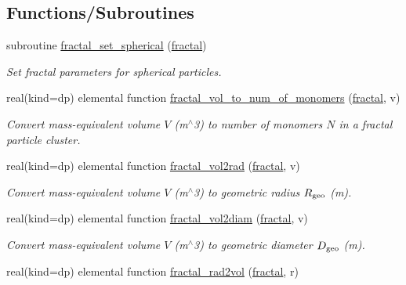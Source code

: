 \subsection*{Functions/\+Subroutines}
\begin{DoxyCompactItemize}
\item 
subroutine \mbox{\hyperlink{namespacepmc__fractal_a6cd53990cfa3426e50dc4c7128a50d6f}{fractal\+\_\+set\+\_\+spherical}} (\mbox{\hyperlink{fractal_8_f90_a949ba7f6f3ce672ed686152acedb28bf}{fractal}})
\begin{DoxyCompactList}\small\item\em Set fractal parameters for spherical particles. \end{DoxyCompactList}\item 
real(kind=dp) elemental function \mbox{\hyperlink{namespacepmc__fractal_a8c77994ce359f18d1a6ada818ac19875}{fractal\+\_\+vol\+\_\+to\+\_\+num\+\_\+of\+\_\+monomers}} (\mbox{\hyperlink{fractal_8_f90_a949ba7f6f3ce672ed686152acedb28bf}{fractal}}, v)
\begin{DoxyCompactList}\small\item\em Convert mass-\/equivalent volume $V$ (m$^\wedge$3) to number of monomers $N$ in a fractal particle cluster. \end{DoxyCompactList}\item 
real(kind=dp) elemental function \mbox{\hyperlink{namespacepmc__fractal_a0bd8a2235975755762809e39c2c8e900}{fractal\+\_\+vol2rad}} (\mbox{\hyperlink{fractal_8_f90_a949ba7f6f3ce672ed686152acedb28bf}{fractal}}, v)
\begin{DoxyCompactList}\small\item\em Convert mass-\/equivalent volume $V$ (m$^\wedge$3) to geometric radius $R_{\rm geo}$ (m). \end{DoxyCompactList}\item 
real(kind=dp) elemental function \mbox{\hyperlink{namespacepmc__fractal_ae2dded7baed16c325ff4b95285e83593}{fractal\+\_\+vol2diam}} (\mbox{\hyperlink{fractal_8_f90_a949ba7f6f3ce672ed686152acedb28bf}{fractal}}, v)
\begin{DoxyCompactList}\small\item\em Convert mass-\/equivalent volume $V$ (m$^\wedge$3) to geometric diameter $D_{\rm geo}$ (m). \end{DoxyCompactList}\item 
real(kind=dp) elemental function \mbox{\hyperlink{namespacepmc__fractal_a79cb00ff9fbed9f45195390589959df5}{fractal\+\_\+rad2vol}} (\mbox{\hyperlink{fractal_8_f90_a949ba7f6f3ce672ed686152acedb28bf}{fractal}}, r)

\end{DoxyCompactItemize}
